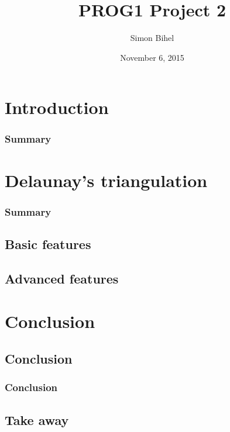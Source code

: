 \documentclass{beamer}
\title[Defense]{PROG1 Project 2}
\author{Simon Bihel}
\institute[ENS Rennes]{\texttt{[image: ENS\_Rennes.png]}\\Computer Science Department, 1st year}
\date{November 6, 2015}
\begin{document}
\section*{Introduction}

	\begin{frame}
		\maketitle
	\end{frame}
	

	
	\begin{frame}
		\frametitle{Summary}
		\tableofcontents
	\end{frame}
	
	\section{Delaunay's triangulation}
	\begin{frame}
		\frametitle{Summary}
		\tableofcontents[currentsection]
	\end{frame}
	
	\subsection{Basic features}
	\begin{frame}
		
	\end{frame}

	
	\subsection{Advanced features}

	
	\section*{Conclusion}
	\subsection*{Conclusion}
	\begin{frame}
		\frametitle{Conclusion}
		
	\end{frame}
	
	
	\subsection*{Take away}
	\begin{frame}
		\frametitle{~}
	\end{frame}
\end{document}

